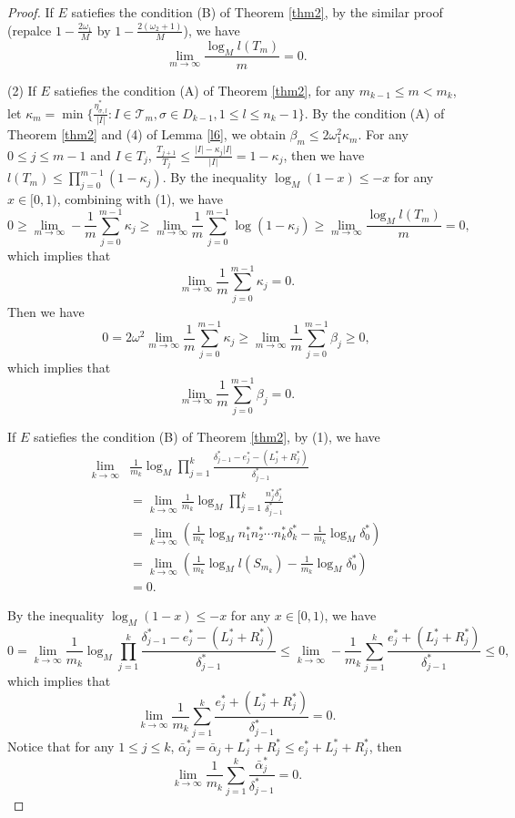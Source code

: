 \documentclass[reqno]{amsart}
\theoremstyle{plain}
\theoremstyle{definition}
\theoremstyle{remark}
\numberwithin{equation}{section} \DeclareMathOperator\intr{int}
\begin{document}
\begin{proof}
If $E$ satiefies the condition {\rm(B)} of Theorem {\rm\ref{thm2}}, by the similar proof (repalce $1-\frac{2\omega_1}{M}$ by $1-\frac{2(\omega_2+1)}{M}$), we have
$$\lim_{m \to \infty} \frac{\log_M l(T_m) }{m}=0.$$

(2) If $E$ satiefies the condition {\rm(A)} of Theorem {\rm\ref{thm2}}, for any $m_{k-1}\le m <m_k$, let $\kappa_m=\min\{\frac{\eta^*_{\sigma,l}}{|I|}:I\in\mathcal{T}_m, \sigma \in D_{k-1}, 1\le l\le n_k-1\}$. By the condition (A) of Theorem \ref{thm2} and (4) of Lemma \ref{l6}, we obtain $\beta_m\le 2\omega_1^2\kappa_m$. For any $0\le j\le m-1$ and $I\in T_j$, $\frac{T_{j+1}}{T_j}\le \frac{|I|-\kappa_j|I|}{|I|}=1-\kappa_j$, then  we have $l(T_m)\le \prod_{j=0}^{m-1}(1-\kappa_j)$. By the inequality $\log_M(1-x)\le -x$ for any $x\in[0,1)$, combining with (1), we have
$$0\ge \lim_{m\to \infty}-\frac{1}{m}\sum_{j=0}^{m-1}\kappa_j\ge \lim_{m\to \infty}\frac{1}{m}\sum_{j=0}^{m-1}\log(1-\kappa_j)\ge \lim_{m\to \infty}\frac{\log_{M}l(T_{m}) }{m}=0,$$
which implies that $$\lim_{m\to \infty}\frac{1}{m}\sum_{j=0}^{m-1}\kappa_j=0.$$
Then we have
$$0=2\omega^2\lim_{m\to \infty}\frac{1}{m}\sum_{j=0}^{m-1}\kappa_j\ge \lim_{m\to \infty}\frac{1}{m}\sum_{j=0}^{m-1}\beta_j\ge 0,$$
which implies that
$$\lim_{m\to \infty}\frac{1}{m}\sum_{j=0}^{m-1}\beta_j=0.$$

If $E$ satiefies the condition {\rm(B)} of Theorem {\rm\ref{thm2}}, by (1), we have
\begin{equation*}
\begin{aligned}
\lim_{k \to \infty} &\frac{1}{m_k} \log_{M}\prod_{j = 1}^{k}\frac{\delta^*_{j-1}-e^*_{j}-(L^*_j+R^*_j)}{\delta^*_{j-1}}\\
&= \lim_{k \to \infty}\frac{1}{m_k}\log_{M}\prod_{j = 1}^{k}\frac{n^*_j\delta^*_j}{\delta^*_{j-1}}\\
&= \lim_{k \to \infty}(\frac{1}{m_k}\log_{M}n^*_1n^*_2\cdots n^*_k\delta^*_k-\frac{1}{m_k}\log_{M}\delta^*_0)\\
&= \lim_{k \to \infty}(\frac{1}{m_k}\log_{M}l(S_{m_k}) -\frac{1}{m_k}\log_{M}\delta^*_0)\\
&=0.
\end{aligned}
\end{equation*}

By the inequality $\log_M(1-x)\le -x$ for any $x\in[0,1)$, we have $$0=\lim_{k \to \infty} \frac{1}{m_k} \log_{M}\prod_{j = 1}^{k}\frac{\delta^*_{j-1}-e^*_{j}-(L^*_j+R^*_j)}{\delta^*_{j-1}}\le\lim_{k \to \infty} -\frac{1}{m_k} \sum_{j = 1}^{k}\frac{e^*_{j}+(L^*_j+R^*_j)}{\delta^*_{j-1}}\le 0,$$
which implies that
$$\lim_{k \to \infty} \frac{1}{m_k} \sum_{j = 1}^{k}\frac{e^*_{j}+(L^*_j+R^*_j)}{\delta^*_{j-1}}=0.$$
Notice that for any $1\le j \le k$, $\bar\alpha^*_{j}=\bar\alpha_{j}+L^*_j+R^*_j\le e^*_{j}+L^*_j+R^*_j$, then
\begin{equation}\label{65}
\lim_{k \to \infty} \frac{1}{m_k} \sum_{j = 1}^{k}\frac{\bar{\alpha}^*_j}{\delta^*_{j-1}}=0.
\end{equation}


\end{proof}
\end{document}
